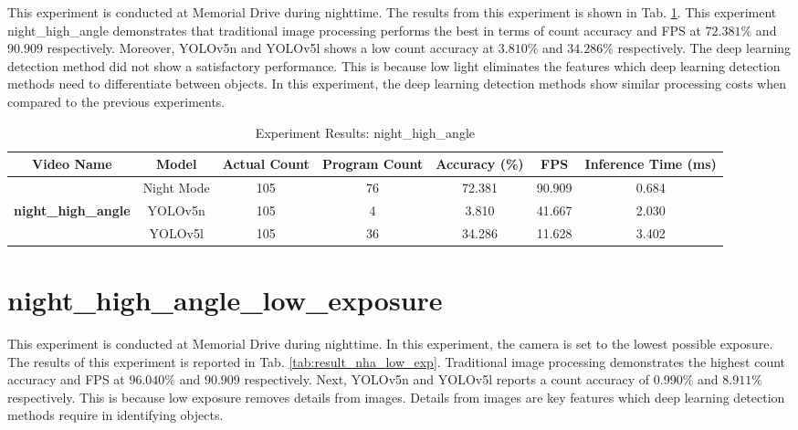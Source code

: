 \documentclass[12pt,a4paper,fleqn]{report}
\begin{document}
This experiment is conducted at Memorial Drive during nighttime.
The results from this experiment is shown in Tab. \ref{tab:result_nha}.
This experiment night\_high\_angle demonstrates that traditional image processing performs the best
in terms of count accuracy and FPS at $72.381\%$ and $90.909$ respectively.
Moreover, YOLOv5n and YOLOv5l shows a low count accuracy at $3.810\%$ and $34.286\%$ respectively.
The deep learning detection method did not show a satisfactory performance.
This is because low light eliminates the features which deep learning detection methods need to
differentiate between objects.
In this experiment, the deep learning detection methods show similar processing costs when compared
to the previous experiments.

\begin{table}[htbp]
    \centering
    \begin{adjustbox}{width=1\textwidth}
    \begin{tabular}{|c|c|c|c|c|c|c|}
    \hline
    \textbf{Video Name} & \textbf{Model} & \textbf{Actual Count} & \textbf{Program Count} & \textbf{Accuracy (\%)} & \textbf{FPS} & \textbf{Inference Time (ms)} \\ \hline
     & Night Mode & 105 & 76 & 72.381 & 90.909 & 0.684 \\ \cline{2-7}
    \textbf{night\_high\_angle} & YOLOv5n & 105 & 4 & 3.810 & 41.667 & 2.030 \\ \cline{2-7}
     & YOLOv5l & 105 & 36 & 34.286 & 11.628 & 3.402 \\ \hline
    \end{tabular}
    \end{adjustbox}
\caption{Experiment Results: night\_high\_angle}
\label{tab:result_nha}
\end{table}

\section{night\_high\_angle\_low\_exposure}

This experiment is conducted at Memorial Drive during nighttime.
In this experiment, the camera is set to the lowest possible exposure.
The results of this experiment is reported in Tab. \ref{tab:result_nha_low_exp}.
Traditional image processing demonstrates the highest count accuracy and FPS at $96.040\%$ and
$90.909$ respectively.
Next, YOLOv5n and YOLOv5l reports a count accuracy of $0.990\%$ and $8.911\%$ respectively.
This is because low exposure removes details from images. 
Details from images are key features which deep learning detection methods require in identifying
objects. 
\end{document}
